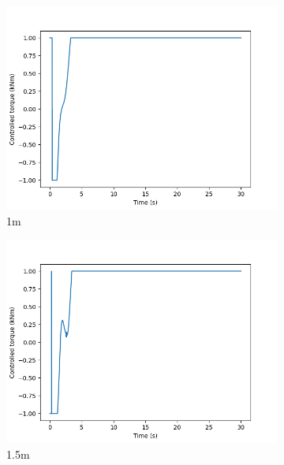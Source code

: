 \documentclass[class=article, crop=false]{standalone}
\begin{document}
\begin{figure}
\begin{subfigure}[b]{0.48\textwidth}
        \includegraphics{scenario1/rov-50m/1.0m/usv_torque}
        \caption{1m}
        \label{}
    \end{subfigure}
    \hfill
    \begin{subfigure}[b]{0.48\textwidth}
        \centering
        \includegraphics{scenario1/rov-50m/1.5m/usv_torque}
        \caption{1.5m}
        \label{}
    \end{subfigure}
    \vfill
    \begin{subfigure}[b]{0.48\textwidth}
        \centering

\end{subfigure}
\end{figure}
\end{document}
